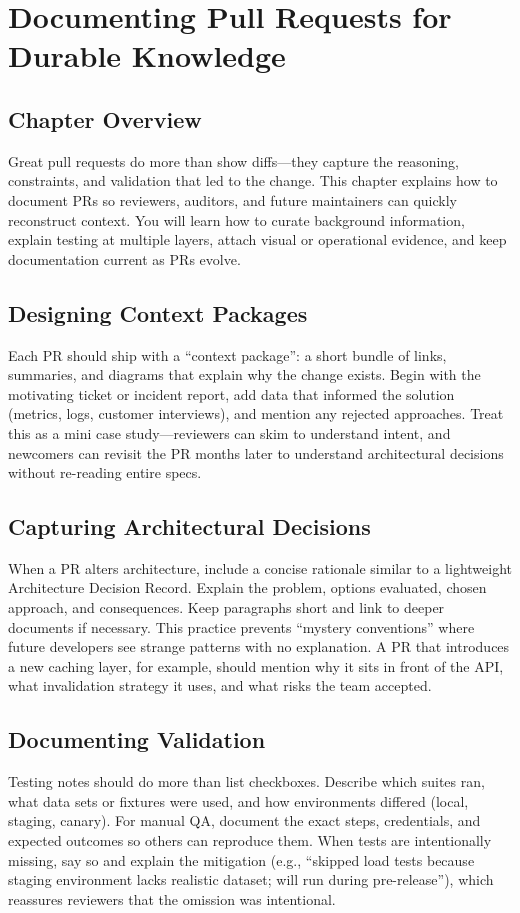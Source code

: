\chapter{Documenting Pull Requests for Durable Knowledge}

\section{Chapter Overview}
Great pull requests do more than show diffs---they capture the reasoning, constraints, and validation that led to the change. This chapter explains how to document PRs so reviewers, auditors, and future maintainers can quickly reconstruct context. You will learn how to curate background information, explain testing at multiple layers, attach visual or operational evidence, and keep documentation current as PRs evolve.

\section{Designing Context Packages}
Each PR should ship with a ``context package'': a short bundle of links, summaries, and diagrams that explain why the change exists. Begin with the motivating ticket or incident report, add data that informed the solution (metrics, logs, customer interviews), and mention any rejected approaches. Treat this as a mini case study---reviewers can skim to understand intent, and newcomers can revisit the PR months later to understand architectural decisions without re-reading entire specs.

\section{Capturing Architectural Decisions}
When a PR alters architecture, include a concise rationale similar to a lightweight Architecture Decision Record. Explain the problem, options evaluated, chosen approach, and consequences. Keep paragraphs short and link to deeper documents if necessary. This practice prevents ``mystery conventions'' where future developers see strange patterns with no explanation. A PR that introduces a new caching layer, for example, should mention why it sits in front of the API, what invalidation strategy it uses, and what risks the team accepted.

\section{Documenting Validation}
Testing notes should do more than list checkboxes. Describe which suites ran, what data sets or fixtures were used, and how environments differed (local, staging, canary). For manual QA, document the exact steps, credentials, and expected outcomes so others can reproduce them. When tests are intentionally missing, say so and explain the mitigation (e.g., ``skipped load tests because staging environment lacks realistic dataset; will run during pre-release''), which reassures reviewers that the omission was intentional.

